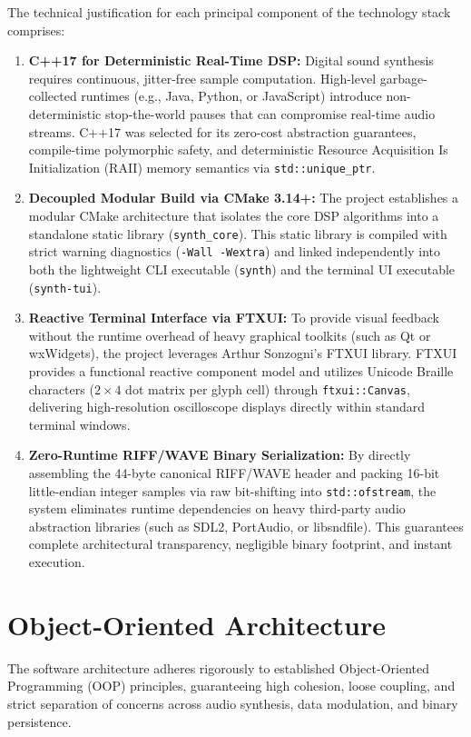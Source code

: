 \documentclass[12pt,a4paper,oneside]{book}
\begin{document}
The technical justification for each principal component of the technology stack comprises:
\begin{enumerate}
    \item \textbf{C++17 for Deterministic Real-Time DSP:} Digital sound synthesis requires continuous, jitter-free sample computation. High-level garbage-collected runtimes (e.g., Java, Python, or JavaScript) introduce non-deterministic stop-the-world pauses that can compromise real-time audio streams. C++17 was selected for its zero-cost abstraction guarantees, compile-time polymorphic safety, and deterministic Resource Acquisition Is Initialization (RAII) memory semantics via \texttt{std::unique\_ptr}.
    \item \textbf{Decoupled Modular Build via CMake 3.14+:} The project establishes a modular CMake architecture that isolates the core DSP algorithms into a standalone static library (\texttt{synth\_core}). This static library is compiled with strict warning diagnostics (\texttt{-Wall -Wextra}) and linked independently into both the lightweight CLI executable (\texttt{synth}) and the terminal UI executable (\texttt{synth-tui}).
    \item \textbf{Reactive Terminal Interface via FTXUI:} To provide visual feedback without the runtime overhead of heavy graphical toolkits (such as Qt or wxWidgets), the project leverages Arthur Sonzogni's FTXUI library. FTXUI provides a functional reactive component model and utilizes Unicode Braille characters ($2 \times 4$ dot matrix per glyph cell) through \texttt{ftxui::Canvas}, delivering high-resolution oscilloscope displays directly within standard terminal windows.
    \item \textbf{Zero-Runtime RIFF/WAVE Binary Serialization:} By directly assembling the 44-byte canonical RIFF/WAVE header and packing 16-bit little-endian integer samples via raw bit-shifting into \texttt{std::ofstream}, the system eliminates runtime dependencies on heavy third-party audio abstraction libraries (such as SDL2, PortAudio, or libsndfile). This guarantees complete architectural transparency, negligible binary footprint, and instant execution.
\end{enumerate}

\section{Object-Oriented Architecture}
The software architecture adheres rigorously to established Object-Oriented Programming (OOP) principles, guaranteeing high cohesion, loose coupling, and strict separation of concerns across audio synthesis, data modulation, and binary persistence.
\end{document}
